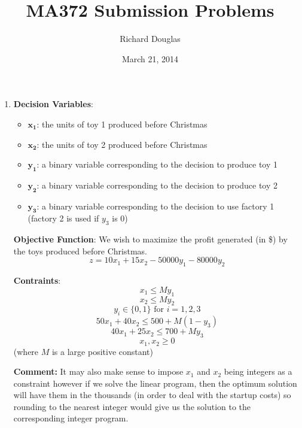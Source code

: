 \documentclass{article}[12pt,a4paper]
\title{MA372 Submission Problems}
\author{Richard Douglas}
\date{March 21,  2014}
\begin{document}
  \maketitle
  \begin{enumerate}
	  \item \textbf{Decision Variables}:
	  \begin{itemize}
	  \item $\mathbf{x_1}$: the units of toy 1 produced before Christmas
	  \item $\mathbf{x_2}$: the units of toy 2 produced before Christmas 
	  \item $\mathbf{y_1}$: a binary variable corresponding to the decision to produce toy 1 
	  \item $\mathbf{y_2}$: a binary variable corresponding to the decision to produce toy 2
	  \item $\mathbf{y_3}$: a binary variable corresponding to the decision to use factory 1 (factory 2 is used if $y_3$ is 0)
	  \end{itemize}
	  
	  \textbf{Objective Function}: \newline
	  We wish to maximize the profit generated (in \$) by the toys produced before Christmas. 
	  $$z = 10x_1 + 15x_2 - 50000y_1 - 80000y_2$$
	  
	   \textbf{Contraints}: \newline
	   $$x_1 \le My_1$$
	   $$x_2 \le My_2$$
	   $$y_i \in \{ 0, 1 \} \mbox{ for } i = 1, 2, 3$$
	   $$50x_1 + 40x_2 \le 500 + M(1 - y_3)$$
	   $$40x_1 + 25x_2 \le 700 + My_3$$
	   $$x_1, x_2 \ge 0$$
	   \hfill (where $M$ is a large positive constant)
	   
	   \textbf{Comment:} \newline
	   It may also make sense to impose $x_1$ and $x_2$ being integers as a constraint however if we solve the linear program, 
	   then the optimum solution will  have them in the thousands (in order to deal with the startup costs) so rounding to the 
	   nearest integer would give us the solution to the corresponding integer program. 
	   \pagebreak
	   

\end{enumerate}
\end{document}
